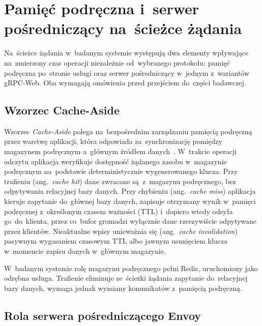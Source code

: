 \cleardoublepage

\chapter{Pamięć podręczna i~serwer pośredniczący na~ścieżce żądania}

\label{cha:WzorceProjektowe}

Na~ścieżce żądania w~badanym systemie występują dwa elementy wpływające na~zmierzony czas operacji niezależnie od~wybranego protokołu: pamięć podręczna po~stronie usługi oraz serwer pośredniczący w~jednym z~wariantów gRPC-Web. Oba wymagają omówienia przed przejściem do~części badawczej.

\section{Wzorzec Cache-Aside}
\label{sec:CacheAside}

Wzorzec \textit{Cache-Aside} polega na~bezpośrednim zarządzaniu pamięcią podręczną przez warstwę aplikacji, która odpowiada za~synchronizację pomiędzy magazynem podręcznym a~głównym źródłem danych~\cite{bib:CacheAside}. W~trakcie operacji odczytu aplikacja weryfikuje dostępność żądanego zasobu w~magazynie podręcznym na~podstawie deterministycznie wygenerowanego klucza. Przy trafieniu (ang.\ \textit{cache hit}) dane zwracane są~z~magazynu podręcznego, bez odpytywania relacyjnej bazy danych. Przy chybieniu (ang.\ \textit{cache miss}) aplikacja kieruje zapytanie do~głównej bazy danych, zapisuje otrzymany wynik w~pamięci podręcznej z~określonym czasem ważności (TTL) i~dopiero wtedy odsyła go~do~klienta, przez co~bufor gromadzi wyłącznie dane rzeczywiście odpytywane przez klientów. Nieaktualne wpisy unieważnia się (ang.\ \textit{cache invalidation}) pasywnym wygasaniem czasowym TTL albo jawnym usunięciem klucza w~momencie zapisu danych w~głównym magazynie.

W~badanym systemie rolę magazynu podręcznego pełni Redis, uruchomiony jako odrębna usługa. Trafienie eliminuje ze~ścieżki żądania zapytanie do~relacyjnej bazy danych, wymaga jednak wymiany komunikatów z~pamięcią podręczną.

\section{Rola serwera pośredniczącego Envoy}
\label{sec:Envoy}

